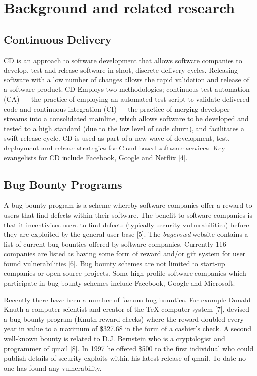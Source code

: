 \documentclass[conference]{IEEEtran}
\begin{document}

\section{Background and related research}

\subsection{Continuous Delivery}
CD is an approach to software development that allows software companies to develop, test and release software in short, discrete delivery cycles. Releasing software with a low number of changes allows the rapid validation and release of a software product. CD Employs two methodologies; continuous test automation (CA) ---  the practice of employing an automated test script to validate delivered code and continuous integration (CI) --- the practice of merging developer streams into a consolidated mainline, which allows software to be developed and tested to a high standard (due to the low level of code churn), and facilitates a swift release cycle. CD is used as part of a new wave of development, test, deployment and release strategies for Cloud based software services. Key evangelists for CD include Facebook, Google and Netflix [4]. 

\subsection{Bug Bounty Programs}
A bug bounty program is a scheme whereby software companies offer a reward to users that find defects within their software. The benefit to software companies is that it incentivises users to find defects (typically security vulnerabilities) before they are exploited by the general user base [5]. The \emph{bugcrowd} website contains a list of current bug bounties offered by software companies.  Currently 116 companies are listed as having some form of reward and/or gift system for user found vulnerabilities [6]. Bug bounty schemes are not limited to start-up companies or open source projects.  Some high profile software companies which participate in bug bounty schemes include Facebook, Google and Microsoft. \par
Recently there have been a number of famous bug bounties. For example Donald Knuth a computer scientist and creator of the TeX computer system [7], devised a bug bounty program (Knuth reward checks) where the reward doubled every year in value to a maximum of  \$327.68 in the form of a cashier's check. A second well-known bounty is related to D.J. Bernstein who is a cryptologist and programmer of qmail [8]. In 1997 he offered \$500 to the first individual who could publish details of security exploits within his latest release of qmail. To date no one has found any vulnerability.
\end{document}
